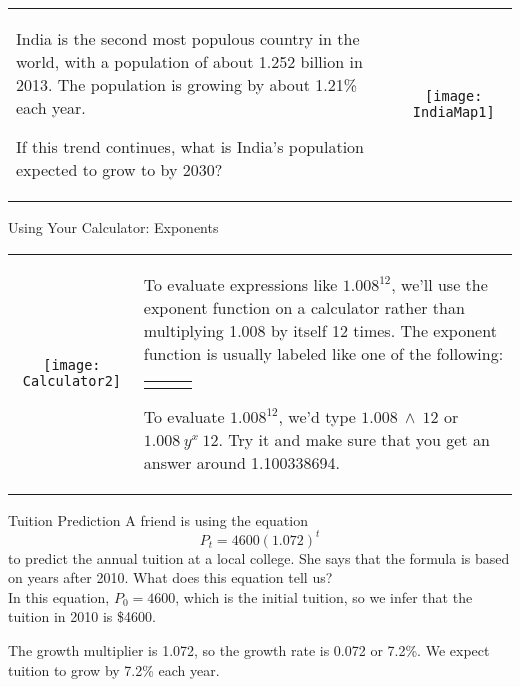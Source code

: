 \begin{try}
\begin{tabular}{b{2in} c}
India is the second most populous country in the world, with a population of about 1.252 billion in 2013.  The population is growing by about 1.21\% each year.

If this trend continues, what is India's population expected to grow to by 2030? & \texttt{[image: IndiaMap1]}
\end{tabular}
\end{try}

\begin{proc}{Using Your Calculator: Exponents}
\begin{tabular}{c l}
\texttt{[image: Calculator2]} & \parbox[b]{3in}{To evaluate expressions like $1.008^{12}$, we'll use the exponent function on a calculator rather than multiplying 1.008 by itself 12 times.  The exponent function is usually labeled like one of the following:
\begin{center}
\begin{tabular}{c c c}
$\boxed{\wedge}$ & $\boxed{y^x}$ & $\boxed{x^y}$
\end{tabular}
\end{center}

To evaluate $1.008^{12}$, we'd type $1.008 \ \boxed{\wedge}\ 12$ or $1.008\ \boxed{y^x}\ 12$.  Try it and make sure that you get an answer around 1.100338694.}
\end{tabular}
\end{proc}
\pagebreak

\begin{example}[https://www.youtube.com/watch?v=_u9RlZX_BkI]{Tuition Prediction}
A friend is using the equation \[P_t = 4600(1.072)^t\] to predict the annual tuition at a local college.  She says that the formula is based on years after 2010.  What does this equation tell us?\\

In this equation, $P_0 = 4600$, which is the initial tuition, so we infer that the tuition in 2010 is \$4600.

The growth multiplier is 1.072, so the growth rate is 0.072 or 7.2\%.  We expect tuition to grow by 7.2\% each year.
\end{example}

